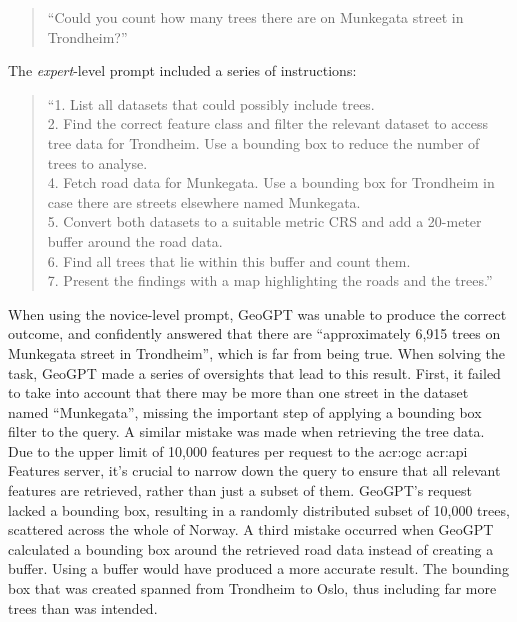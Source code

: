 \begin{quote}
    \enquote{Could you count how many trees there are on Munkegata street in Trondheim?}
\end{quote}

\noindent The \textit{expert}-level prompt included a series of instructions:

\begin{quote}
    \enquote{1. List all datasets that could possibly include trees. \\
        2. Find the correct feature class and filter the relevant dataset to access tree data for Trondheim. Use a bounding box to reduce the number of trees to analyse. \\
        4. Fetch road data for Munkegata. Use a bounding box for Trondheim in case there are streets elsewhere named Munkegata. \\
        5. Convert both datasets to a suitable metric CRS and add a 20-meter buffer around the road data. \\
        6. Find all trees that lie within this buffer and count them. \\
        7. Present the findings with a map highlighting the roads and the trees.}
\end{quote}

\FloatBarrier

When using the novice-level prompt, GeoGPT was unable to produce the correct outcome, and confidently answered that there are \enquote{approximately 6,915 trees on Munkegata street in Trondheim}, which is far from being true. When solving the task, GeoGPT made a series of oversights that lead to this result. First, it failed to take into account that there may be more than one street in the dataset named \enquote{Munkegata}, missing the important step of applying a bounding box filter to the query. A similar mistake was made when retrieving the tree data. Due to the upper limit of 10,000 features per request to the \acrshort{acr:ogc} \acrshort{acr:api} Features server, it's crucial to narrow down the query to ensure that all relevant features are retrieved, rather than just a subset of them. GeoGPT's request lacked a bounding box, resulting in a randomly distributed subset of 10,000 trees, scattered across the whole of Norway. A third mistake occurred when GeoGPT calculated a bounding box around the retrieved road data instead of creating a buffer. Using a buffer would have produced a more accurate result. The bounding box that was created spanned from Trondheim to Oslo, thus including far more trees than was intended.

